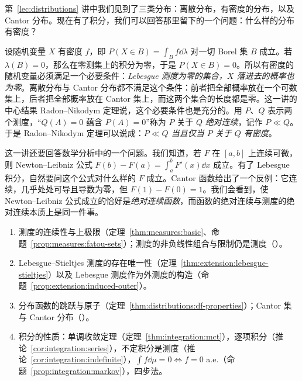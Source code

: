 \label{lec:absolute-continuity}

第~\ref{lec:distributions} 讲中我们见到了三类分布：离散分布，有密度的分布，以及 Cantor 分布。现在有了积分，我们可以回答那里留下的一个问题：什么样的分布有密度？

设随机变量 $X$ 有密度 $f$，即 $P(X\in B)=\int_Bf\dd\lambda$ 对一切 Borel 集 $B$ 成立。若 $\lambda(B)=0$，那么在零测集上的积分为零，于是 $P(X\in B)=0$。所以有密度的随机变量必须满足一个必要条件：\emph{Lebesgue 测度为零的集合，$X$ 落进去的概率也为零}。离散分布与 Cantor 分布都不满足这个条件：前者把全部概率放在一个可数集上，后者把全部概率放在 Cantor 集上，而这两个集合的长度都是零。这一讲的中心结果 Radon--Nikodym 定理说，这个必要条件也是充分的。用 $P$、$Q$ 表示两个测度，“$Q(A)=0$ 蕴含 $P(A)=0$”称为 $P$ 关于 $Q$ \emph{绝对连续}，记作 $P\ll Q$。于是 Radon--Nikodym 定理可以说成：\emph{$P\ll Q$ 当且仅当 $P$ 关于 $Q$ 有密度}。

这一讲还要回答数学分析中的一个问题。我们知道，若 $F$ 在 $[a,b]$ 上连续可微，则 Newton--Leibniz 公式 $F(b)-F(a)=\int_a^bF'(x)\dd x$ 成立。有了 Lebesgue 积分，自然要问这个公式对什么样的 $F$ 成立。Cantor 函数给出了一个反例：它连续，几乎处处可导且导数为零，但 $F(1)-F(0)=1$。我们会看到，使 Newton--Leibniz 公式成立的恰好是\emph{绝对连续函数}，而函数的绝对连续与测度的绝对连续本质上是同一件事。


\begin{enumerate}
\item 测度的连续性与上极限（定理~\ref{thm:measures:basic}、命题~\ref{prop:measures:fatou-sets}）；测度的非负线性组合与限制仍是测度（）。
\item Lebesgue--Stieltjes 测度的存在唯一性（定理~\ref{thm:extension:lebesgue-stieltjes}）以及 Lebesgue 测度作为外测度的构造（命题~\ref{prop:extension:induced-outer}）。
\item 分布函数的跳跃与原子（定理~\ref{thm:distributions:df-properties}）；Cantor 集与 Cantor 分布（）。
\item 积分的性质：单调收敛定理（定理~\ref{thm:integration:mct}），逐项积分（推论~\ref{cor:integration:series}），不定积分是测度（推论~\ref{cor:integration:indefinite}），$\int f\dd\mu=0\iff f=0$ a.e.（命题~\ref{prop:integration:markov}），四步法。
\end{enumerate}

